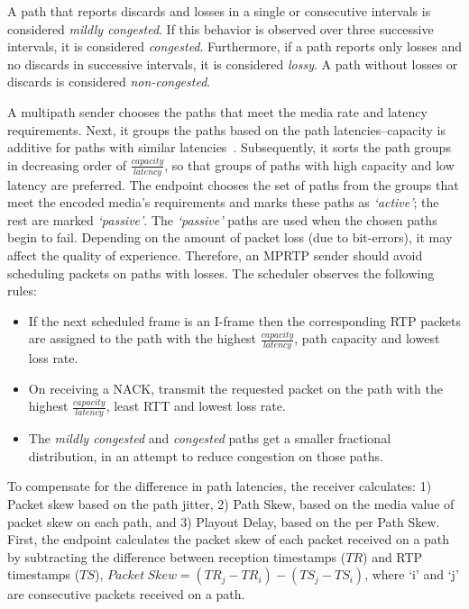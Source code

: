 A path that reports discards and losses in a single or consecutive intervals
is considered \emph{mildly congested}. If this behavior is observed over three
successive intervals, it is considered \emph{congested}. Furthermore, if a
path reports only losses and no discards in successive intervals, it is
considered \emph{lossy}. A path without losses or discards is considered
\emph{non-congested}.

A multipath sender chooses the paths that meet the media rate and latency
requirements. Next, it groups the paths based on the path latencies--capacity
is additive for paths with similar latencies~\cite{Wischik:2008:RPP}.
Subsequently, it sorts the path groups in decreasing order of
$\frac{capacity}{latency}$, so that groups of paths with high capacity 
and low latency are preferred. 
The endpoint chooses the set of paths from the groups that meet
the encoded media's requirements and marks these paths as \emph{`active'}; the rest
are marked \emph{`passive'}. The \emph{`passive'} paths are used when the
chosen paths begin to fail. Depending on the amount of packet loss (due
to bit-errors), it may affect the quality of experience. Therefore, an MPRTP
sender should avoid scheduling packets on paths with losses. The scheduler
observes the following rules:

\begin{itemize}
\setlength{\itemsep}{0pt}

  \item If the next scheduled frame is an I-frame then the corresponding RTP
  packets are assigned to the path with the highest $\frac{capacity}{latency}$,
  path capacity and lowest loss rate.

  \item On receiving a NACK, transmit the requested packet on the path with
  the highest $\frac{capacity}{latency}$, least RTT and lowest loss rate.

  \item The \emph{mildly congested} and \emph{congested} paths get a smaller
  fractional distribution, in an attempt to reduce congestion on those paths.

\end{itemize}

To compensate for the difference in path latencies, the receiver calculates:
1) Packet skew based on the path jitter, 2) Path Skew, based on the media
value of packet skew on each path, and 3) Playout Delay, based on the per
Path Skew. First, the endpoint calculates the packet skew of each packet
received on a path by subtracting the difference between reception timestamps
($TR$) and RTP timestamps ($TS$), $Packet\ Skew = (TR_j - TR_i) - (TS_j -
TS_i)$, where `i' and `j' are consecutive packets received on a path.

